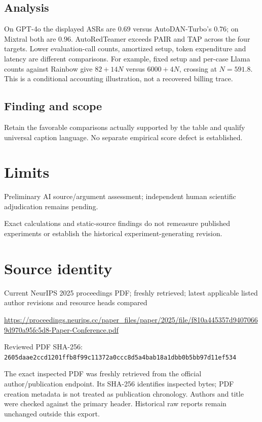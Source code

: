 \documentclass[11pt]{article}
\begin{document}
\subsection*{Analysis}

On GPT-4o the displayed ASRs are \(0.69\) versus AutoDAN-Turbo’s \(0.76\); on Mixtral both are \(0.96\). AutoRedTeamer exceeds PAIR and TAP across the four targets. Lower evaluation-call counts, amortized setup, token expenditure and latency are different comparisons. For example, fixed setup and per-case Llama counts against Rainbow give \(82+14N\) versus \(6000+4N\), crossing at \(N=591.8\). This is a conditional accounting illustration, not a recovered billing trace.

\subsection*{Finding and scope}

Retain the favorable comparisons actually supported by the table and qualify universal caption language. No separate empirical score defect is established.

\section*{Limits}

Preliminary AI source/argument assessment; independent human scientific adjudication remains pending.\par

Exact calculations and static-source findings do not remeasure published experiments or establish the historical experiment-generating revision.\par

\section*{Source identity}

Current NeurIPS 2025 proceedings PDF; freshly retrieved; latest applicable listed author revisions and resource heads compared

\url{https://proceedings.neurips.cc/paper_files/paper/2025/file/f810a445357d94070669d970a95fc5d8-Paper-Conference.pdf}

Reviewed PDF SHA-256: \nolinkurl{2605daae2ccd1201ffb8f99c11372a0ccc8d5a4bab18a1dbb0b5bb97d11ef534}

The exact inspected PDF was freshly retrieved from the official author/publication endpoint. Its SHA-256 identifies inspected bytes; PDF creation metadata is not treated as publication chronology. Authors and title were checked against the primary header. Historical raw reports remain unchanged outside this export.
\end{document}
